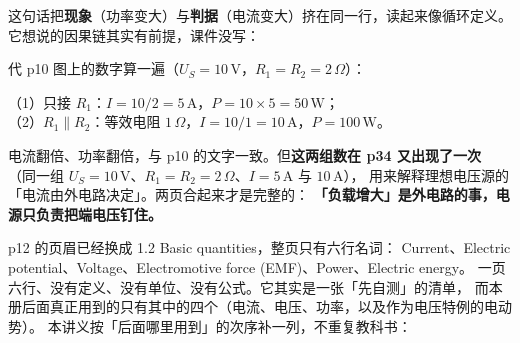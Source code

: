 \documentclass[11pt]{ctexart}
\begin{document}
这句话把\textbf{现象}（功率变大）与\textbf{判据}（电流变大）挤在同一行，读起来像循环定义。
它想说的因果链其实有前提，课件没写：

\par{}

代 p10 图上的数字算一遍（$U_S=10\,\mathrm{V}$，$R_1=R_2=2\,\Omega$）：

\par\vspace{1pt}
\noindent
（1）只接 $R_1$：$I=10/2=5\,\mathrm{A}$，$P=10\times5=50\,\mathrm{W}$；\\
（2）$R_1\parallel R_2$：等效电阻 $1\,\Omega$，$I=10/1=10\,\mathrm{A}$，$P=100\,\mathrm{W}$。
\par\vspace{2pt}

电流翻倍、功率翻倍，与 p10 的文字一致。但\textbf{这两组数在 p34 又出现了一次}
（同一组 $U_S=10\,\mathrm{V}$、$R_1=R_2=2\,\Omega$、$I=5\,\mathrm{A}$ 与 $10\,\mathrm{A}$），
用来解释理想电压源的「电流由外电路决定」。两页合起来才是完整的：
\textbf{「负载增大」是外电路的事，电源只负责把端电压钉住。}




p12 的页眉已经换成 1.2 Basic quantities，整页只有六行名词：
Current、Electric potential、Voltage、Electromotive force (EMF)、Power、Electric energy。
一页六行、没有定义、没有单位、没有公式。它其实是一张「先自测」的清单，
而本册后面真正用到的只有其中的四个（电流、电压、功率，以及作为电压特例的电动势）。
本讲义按「后面哪里用到」的次序补一列，不重复教科书：
\end{document}
